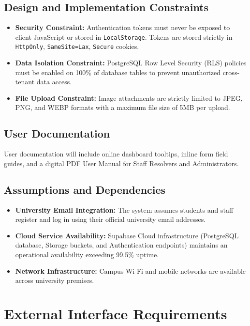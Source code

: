 \documentclass[12pt, a4paper]{article}
\begin{document}
\subsection{Design and Implementation Constraints}
\begin{itemize}[leftmargin=*]
    \item \textbf{Security Constraint:} Authentication tokens must never be exposed to client JavaScript or stored in \texttt{LocalStorage}. Tokens are stored strictly in \texttt{HttpOnly}, \texttt{SameSite=Lax}, \texttt{Secure} cookies.
    \item \textbf{Data Isolation Constraint:} PostgreSQL Row Level Security (RLS) policies must be enabled on 100\% of database tables to prevent unauthorized cross-tenant data access.
    \item \textbf{File Upload Constraint:} Image attachments are strictly limited to JPEG, PNG, and WEBP formats with a maximum file size of 5MB per upload.
\end{itemize}

\subsection{User Documentation}
User documentation will include online dashboard tooltips, inline form field guides, and a digital PDF User Manual for Staff Resolvers and Administrators.

\subsection{Assumptions and Dependencies}
\begin{itemize}[leftmargin=*]
    \item \textbf{University Email Integration:} The system assumes students and staff register and log in using their official university email addresses.
    \item \textbf{Cloud Service Availability:} Supabase Cloud infrastructure (PostgreSQL database, Storage buckets, and Authentication endpoints) maintains an operational availability exceeding 99.5\% uptime.
    \item \textbf{Network Infrastructure:} Campus Wi-Fi and mobile networks are available across university premises.
\end{itemize}

\section{External Interface Requirements}
\end{document}
